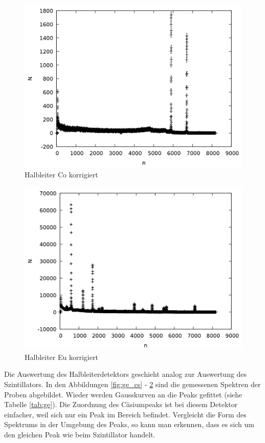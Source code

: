 \begin{figure}
\centering
\includegraphics[width=0.7\linewidth]{data/ge_co.png}
\caption{Halbleiter Co korrigiert}
\label{fig:ge_co}
\end{figure}

\begin{figure}
\centering
\includegraphics[width=0.7\linewidth]{data/ge_eu.png}
\caption{Halbleiter Eu korrigiert}
\label{fig:ge_eu}
\end{figure}

Die Auswertung des Halbleiterdetektors geschieht analog zur Auswertung des Szintillators. In den Abbildungen \ref{fig:ge_cs} - \ref{fig:ge_eu} sind die gemessenen Spektren der Proben abgebildet. Wieder werden Gausskurven an die Peaks gefittet (siehe Tabelle \ref{tab:ge}). Die Zuordnung des Cäsiumpeaks ist bei diesem Detektor einfacher, weil sich nur ein Peak im Bereich befindet. Vergleicht die Form des Spektrums in der Umgebung des Peaks, so kann man erkennen, dass es sich um den gleichen Peak wie beim Szintillator handelt.\\

